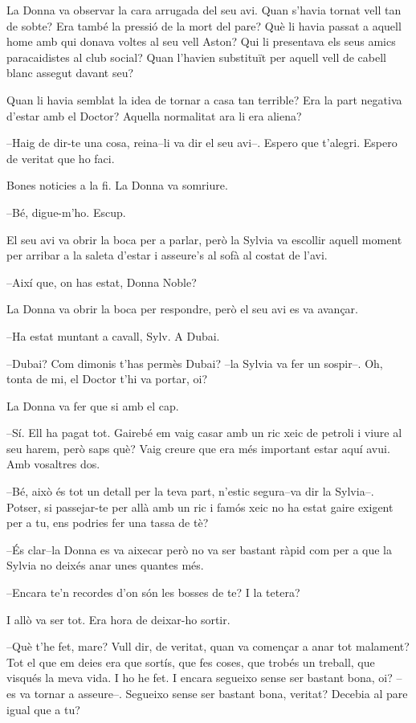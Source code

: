 La Donna va observar la cara arrugada del seu avi. Quan s'havia tornat
vell tan de sobte? Era també la pressió de la mort del pare? Què li
havia passat a aquell home amb qui donava voltes al seu vell Aston? Qui
li presentava els seus amics paracaidistes al club social? Quan l'havien
substituït per aquell vell de cabell blanc assegut davant seu?

Quan li havia semblat la idea de tornar a casa tan terrible? Era la part
negativa d'estar amb el Doctor? Aquella normalitat ara li era aliena?

--Haig de dir-te una cosa, reina--li va dir el seu avi--. Espero que
t'alegri. Espero de veritat que ho faci.

Bones noticies a la fi. La Donna va somriure.

--Bé, digue-m'ho. Escup.

El seu avi va obrir la boca per a parlar, però la Sylvia va escollir
aquell moment per arribar a la saleta d'estar i asseure's al sofà al
costat de l'avi.

--Així que, on has estat, Donna Noble?

La Donna va obrir la boca per respondre, però el seu avi es va avançar.

--Ha estat muntant a cavall, Sylv. A Dubai.

--Dubai? Com dimonis t'has permès Dubai? --la Sylvia va fer un sospir--.
Oh, tonta de mi, el Doctor t'hi va portar, oi?

La Donna va fer que si amb el cap.

--Sí. Ell ha pagat tot. Gairebé em vaig casar amb un ric xeic de petroli
i viure al seu harem, però saps què? Vaig creure que era més important
estar aquí avui. Amb vosaltres dos.

--Bé, això és tot un detall per la teva part, n'estic segura--va dir la
Sylvia--. Potser, si passejar-te per allà amb un ric i famós xeic no ha
estat gaire exigent per a tu, ens podries fer una tassa de tè?

--És clar--la Donna es va aixecar però no va ser bastant ràpid com per a
que la Sylvia no deixés anar unes quantes més.

--Encara te'n recordes d'on són les bosses de te? I la tetera?

I allò va ser tot. Era hora de deixar-ho sortir.

--Què t'he fet, mare? Vull dir, de veritat, quan va començar a anar tot
malament? Tot el que em deies era que sortís, que fes coses, que trobés
un treball, que visqués la meva vida. I ho he fet. I encara segueixo
sense ser bastant bona, oi? --es va tornar a asseure--. Segueixo sense
ser bastant bona, veritat? Decebia al pare igual que a tu?

